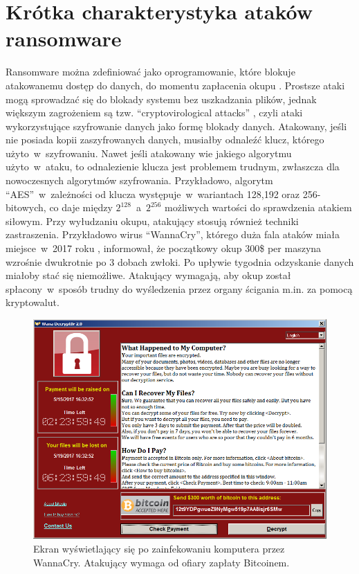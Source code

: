\section{Krótka charakterystyka ataków ransomware}
Ransomware można zdefiniować jako oprogramowanie, które blokuje atakowanemu dostęp do danych, do momentu zapłacenia okupu \cite{ransomware_us}. Prostsze ataki mogą sprowadzać się do blokady systemu bez uszkadzania plików, jednak większym zagrożeniem są tzw. \foreignquote{english}{cryptovirological attacks} \cite{502676}, czyli ataki wykorzystujące szyfrowanie danych jako formę blokady danych. Atakowany, jeśli nie posiada kopii zaszyfrowanych danych, musiałby odnaleźć klucz, którego użyto~w~szyfrowaniu. Nawet jeśli atakowany wie jakiego algorytmu użyto~w~ataku, to odnalezienie klucza jest problemem trudnym, zwłaszcza dla nowoczesnych algorytmów szyfrowania. Przykładowo, algorytm \foreignquote{english}{AES}~w~zależności od klucza występuje~w~wariantach 128,192 oraz 256-bitowych, co daje między $2^{128}$~a~$2^{256}$ możliwych wartości do sprawdzenia atakiem siłowym. 
\newline
Przy wyłudzaniu okupu, atakujący stosują również techniki zastraszenia. Przykładowo wirus \foreignquote{english}{WannaCry}, którego duża fala ataków miała miejsce~w~2017 roku \cite{czarnecki_oto_2017}, informował, że początkowy okup 300\$ per maszyna wzrośnie dwukrotnie po 3 dobach zwłoki. Po upływie tygodnia odzyskanie danych miałoby stać się niemożliwe. Atakujący wymagają, aby okup został spłacony~w~sposób trudny do wyśledzenia przez organy ścigania m.in. za pomocą kryptowalut.
\begin{figure}[H]
    \centering
    \includegraphics[width=0.8\linewidth]{rysunki/wannacry.png}
    \caption{Ekran wyświetlający się po zainfekowaniu komputera przez WannaCry. Atakujący wymaga od ofiary zapłaty Bitcoinem\protect\footnotemark.}
    \label{fig:enter-label}
\end{figure}

